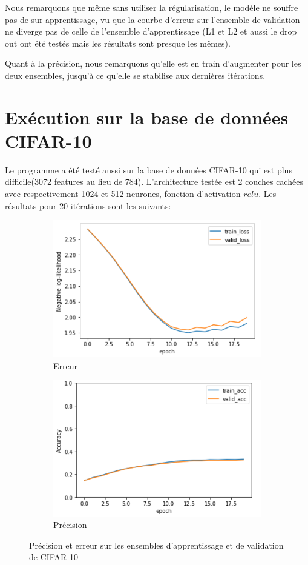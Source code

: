 \documentclass[a4paper,english,12pt]{article}
\begin{document}
Nous remarquons que même sans utiliser la régularisation, le modèle ne souffre pas de sur apprentissage, vu que la courbe d'erreur sur l'ensemble de validation ne diverge pas de celle de l'ensemble d'apprentissage (L1 et L2 et aussi le drop out ont été testés mais les résultats sont presque les mêmes).

Quant à la précision, nous remarquons qu'elle est en train d'augmenter pour les deux ensembles, jusqu'à ce qu'elle se stabilise aux dernières itérations.

\section{Exécution sur la base de données CIFAR-10}
Le programme a été testé aussi sur la base de données CIFAR-10 qui est plus difficile(3072 features au lieu de 784). L'architecture testée est 2 couches cachées avec respectivement 1024 et 512 neurones, fonction d'activation $relu$. Les résultats pour 20 itérations sont les suivants:

\begin{figure}[H]
	\centering
	\begin{subfigure}{0.45\textwidth}
		\includegraphics[width=\textwidth]{error_cifar10}
		\caption{Erreur}
	\end{subfigure}
	\begin{subfigure}{0.45\textwidth}
		\includegraphics[width=\textwidth]{accuracy_cifar10}
		\caption{Précision}
	\end{subfigure}
	\caption{Précision et erreur sur les ensembles d'apprentissage et de validation de CIFAR-10}
\end{figure}
\end{document}
